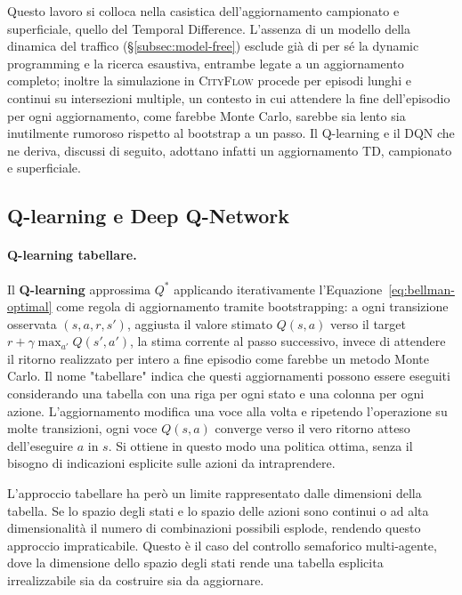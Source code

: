 Questo lavoro si colloca nella casistica dell'aggiornamento campionato e superficiale, quello del Temporal Difference.
L'assenza di un modello della dinamica del traffico (§\ref{subsec:model-free}) esclude
già di per sé la dynamic programming e la ricerca esaustiva, entrambe
legate a un aggiornamento completo; inoltre la simulazione in \textsc{CityFlow} procede
per episodi lunghi e continui su intersezioni multiple, un contesto in
cui attendere la fine dell'episodio per ogni aggiornamento, come farebbe
Monte Carlo, sarebbe sia lento sia inutilmente rumoroso rispetto al
bootstrap a un passo. Il Q-learning e il DQN che ne deriva, discussi di
seguito, adottano infatti un aggiornamento TD, campionato e superficiale.

\subsection{Q-learning e Deep Q-Network}

\paragraph{Q-learning tabellare.} Il \textbf{Q-learning} \citep{suttonbarto2018} approssima $Q^*$
applicando iterativamente l'Equazione~\ref{eq:bellman-optimal} come
regola di aggiornamento tramite bootstrapping: a ogni transizione
osservata $(s,a,r,s')$, aggiusta il valore stimato $Q(s,a)$ verso il
target $r + \gamma \max_{a'} Q(s',a')$, la stima corrente al passo
successivo, invece di attendere il ritorno realizzato per intero a fine
episodio come farebbe un metodo Monte Carlo. Il nome "tabellare" indica
che questi aggiornamenti possono essere eseguiti considerando una tabella con una riga per ogni stato e una
colonna per ogni azione. L'aggiornamento modifica una voce alla volta e
ripetendo l'operazione su molte transizioni, ogni voce $Q(s,a)$ converge verso il
vero ritorno atteso dell'eseguire $a$ in $s$. Si ottiene in questo modo una politica
ottima, senza il bisogno di indicazioni esplicite sulle azioni da intraprendere.

L'approccio tabellare ha però un limite rappresentato dalle dimensioni della tabella.
Se lo spazio degli stati e lo spazio delle azioni sono continui o ad alta dimensionalità il numero di combinazioni possibili esplode,
rendendo questo approccio impraticabile.
Questo è il caso del controllo semaforico multi-agente, dove la dimensione dello spazio degli stati rende una
tabella esplicita irrealizzabile sia da costruire sia da aggiornare.

